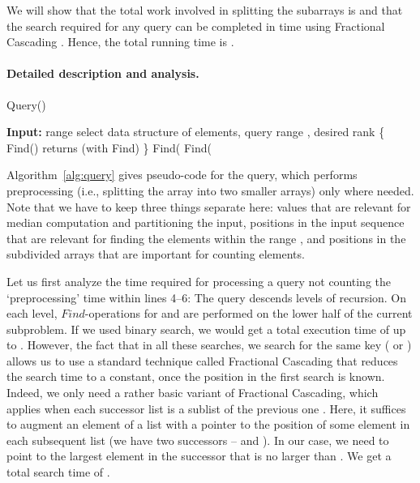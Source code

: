 \documentclass[a4paper,10pt]{article}
\newcommand{\Id}[1]{\ensuremath{\mathit{#1}}}
\begin{document}
We will show that the total work involved in splitting the subarrays
is  and that the search required for any query can be completed in  time using Fractional
Cascading \cite{fractionalcascading}.
Hence, the total running time is .

\paragraph*{Detailed description and analysis.}
\begin{algorithm}
\caption{Query()} \label{alg:query}
\dontprintsemicolon
{\bf Input:} range select data structure  of elements, query range , desired rank \;
\lIf{}{\Return } \;
\{ Find() returns   (with Find)  \} \; 
 Find(  \;
 Find(  \;
 \;
  \;   

\end{algorithm}

Algorithm~\ref{alg:query} gives pseudo-code for the query,
which performs preprocessing (i.e., splitting the array into two smaller arrays) 
only where needed. Note that we have to keep three things separate here: values that
are relevant for median computation and partitioning the input, positions in the input sequence
that are relevant for finding the elements within the range , and positions in 
the subdivided arrays that are important for counting elements.

Let us first analyze the time required for processing a query not
counting the `preprocessing' time within lines 4--6: The query
descends  levels of recursion. On each level,
\Id{Find}-operations for  and  are performed on the lower half
of the current subproblem.  If we  used binary search, we would
get a total execution time of up to .  However, the fact that in all
these searches, we search for the same key ( or ) allows us to use
a standard technique called Fractional Cascading
\cite{fractionalcascading} that reduces the search time to a constant,
once the position in the first search is known. Indeed, we only need a rather basic
variant of Fractional Cascading, which applies when each
successor list is a sublist of the previous one \cite{BKOS97}.  Here,
it suffices to augment an element  of a list with a pointer to the
position of some element  in each subsequent list (we
have two successors --  and ).  In our case, we need
to point to the largest element in the successor that is no larger
than .  We get a total search time of . 
\end{document}
